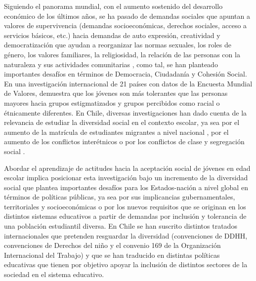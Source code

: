 \documentclass[12pt,twoside]{templates/facsothesis}
\begin{document}
Siguiendo el panorama mundial, con el aumento sostenido del desarrollo económico de los últimos años, se ha pasado de demandas sociales que apuntan a valores de supervivencia (demandas socioeconómicas, derechos sociales, acceso a servicios básicos, etc.) hacia demandas de auto expresión, creatividad y democratización que ayudan a reorganizar las normas sexuales, los roles de género, los valores familiares, la religiosidad, la relación de las personas con la naturaleza y sus actividades comunitarias \citep{inglehart_Modernization_2001}, como tal, se han planteado importantes desafíos en términos de Democracia, Ciudadanía y Cohesión Social. En una investigación internacional de 21 países con datos de la Encuesta Mundial de Valores, \citet{vala_youth_2010} demuestra que los jóvenes son más tolerantes que las personas mayores hacia grupos estigmatizados y grupos percibidos como racial o étnicamente diferentes. En Chile, diversas investigaciones han dado cuenta de la relevancia de estudiar la diversidad social en el contexto escolar, ya sea por el aumento de la matrícula de estudiantes migrantes a nivel nacional \citep{caqueo-urizar_discriminacion_2019, bustosgonzalez_gestion_2018, alarcon-leiva_migracion_2021, gelber_mitos_2021, jimenezvargas_modelos_2014, mera-lemp_school_2020}, por el aumento de los conflictos interétnicos \citep{figueiredo_impact_2020, webb_indigenous_2015} o por los conflictos de clase y segregación social \citep{gonzalez_acceso_2016, rodrigo_social_2021, hernandez_eleccion_2015}.

Abordar el aprendizaje de actitudes hacia la aceptación social de jóvenes en edad escolar implica posicionar esta investigación bajo un incremento de la diversidad social que plantea importantes desafíos para los Estados-nación a nivel global en términos de políticas públicas, ya sea por sus implicancias gubernamentales, territoriales y socioeconómicas o por los nuevos requisitos que se originan en los distintos sistemas educativos a partir de demandas por inclusión y tolerancia de una población estudiantil diversa. En Chile se han suscrito distintos tratados internacionales que pretenden resguardar la diversidad (convenciones de DDHH, convenciones de Derechos del niño y el convenio 169 de la Organización Internacional del Trabajo) y que se han traducido en distintas políticas educativas que tienen por objetivo apoyar la inclusión de distintos sectores de la sociedad en el sistema educativo.
\end{document}
